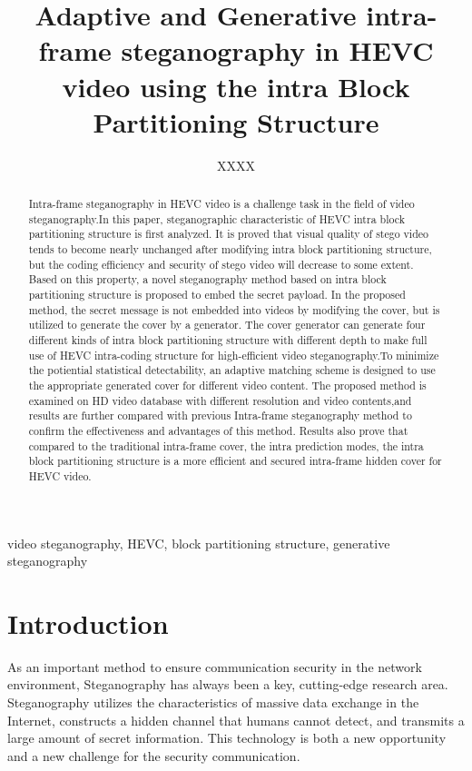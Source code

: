 \documentclass[journal,sort]{IEEEtran}
\begin{document}
\title{Adaptive and Generative intra-frame steganography in HEVC video using the intra Block Partitioning Structure}
\author{XXXX}
	

\maketitle

\begin{abstract}
Intra-frame steganography in HEVC video is a challenge task in the field of video steganography.In this paper, steganographic characteristic of HEVC intra block partitioning structure is first analyzed. It is proved that visual quality of stego video tends to become nearly unchanged after modifying intra block partitioning structure, but the coding efficiency and security of stego video will decrease to some extent.
Based on this property, a novel steganography method based on intra block partitioning structure is proposed to embed the secret payload. In the proposed method, the secret message is not embedded into videos by modifying the cover, but is utilized to generate the cover by a generator. The cover generator can generate four different kinds of intra block partitioning structure with different depth to make full use of HEVC intra-coding structure for high-efficient video steganography.To minimize the potiential statistical detectability, an adaptive matching scheme is designed to use the appropriate generated cover for different video content.
The proposed method is examined on HD video database with different resolution and video contents,and results are further compared with previous Intra-frame steganography method to confirm the effectiveness and advantages of this method. Results also prove that compared to the traditional intra-frame cover, the intra prediction modes, the intra block partitioning structure is a more efficient and secured intra-frame hidden cover for HEVC video.


	
	
\end{abstract}	
\begin{IEEEkeywords}
		video steganography, HEVC, block partitioning structure, generative steganography
\end{IEEEkeywords}
	
\section{Introduction\label{intro}}

As an important method to ensure communication security in the network environment, Steganography has always been a key, cutting-edge research area. Steganography utilizes the characteristics of massive data exchange in the Internet, constructs a hidden channel that humans cannot detect, and transmits a large amount of secret information. This technology is both a new opportunity and a new challenge for the security communication.
\end{document}
